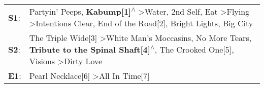 \begin{supertabular}{p{0.03\textwidth}p{0.92\textwidth}}
 \textbf{S1}:  &  Partyin' Peeps\textsuperscript{}, \enspace \textbf{Kabump[1]\textsuperscript{$\wedge$}} \textgreater \enspace Water\textsuperscript{}, \enspace 2nd Self\textsuperscript{}, \enspace Eat\textsuperscript{} \textgreater \enspace Flying\textsuperscript{} \textgreater \enspace Intentions Clear\textsuperscript{}, \enspace End of the Road[2]\textsuperscript{}, \enspace Bright Lights, Big City\textsuperscript{}  \enspace  \\
 \textbf{S2}:  &                                                         The Triple Wide[3]\textsuperscript{} \textgreater \enspace White Man's Moccasins\textsuperscript{}, \enspace No More Tears\textsuperscript{}, \enspace \textbf{Tribute to the Spinal Shaft[4]\textsuperscript{$\wedge$}}, \enspace The Crooked One[5]\textsuperscript{}, \enspace Visions\textsuperscript{} \textgreater \enspace Dirty Love\textsuperscript{}  \enspace  \\
 \textbf{E1}:  &                                                                                                                                                                                                                                                                                                                             Pearl Necklace[6]\textsuperscript{} \textgreater \enspace All In Time[7]\textsuperscript{}  \enspace  \\
\end{supertabular}
